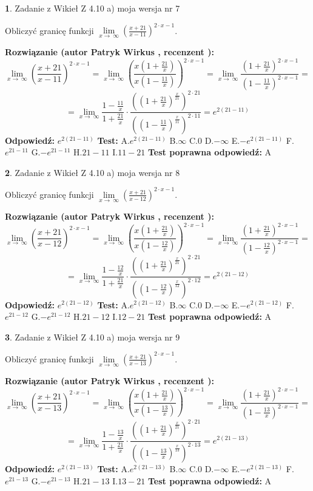 \documentclass[12pt, a4paper]{article}
\theoremstyle{definition} %
\newtheorem{zad}{}
\newcommand{\zadStart}[1]{\begin{zad}#1\newline}
\newcommand{\zadStop}{\end{zad}}
\newcommand{\rozwStart}[2]{\noindent \textbf{Rozwiązanie (autor #1 , recenzent #2): }\newline}
\newcommand{\rozwStop}{\newline}
\newcommand{\odpStart}{\noindent \textbf{Odpowiedź:}\newline}
\newcommand{\odpStop}{\newline}
\newcommand{\testStart}{\noindent \textbf{Test:}\newline}
\newcommand{\testStop}{\newline}
\newcommand{\kluczStart}{\noindent \textbf{Test poprawna odpowiedź:}\newline}
\newcommand{\kluczStop}{\newline}
\begin{document}
\zadStart{Zadanie z Wikieł Z 4.10 a) moja wersja nr 7}


Obliczyć granicę funkcji  $\lim\limits_{x\to\ \infty}(\frac{x+21}{x-11})^{2\cdot x-1}$.
\zadStop
\rozwStart{Patryk Wirkus}{}
$$\lim\limits_{x\to\ \infty}(\frac{x+21}{x-11})^{2\cdot x-1} = \lim\limits_{x\to\ \infty}(\frac{x(1+\frac{21}{x})}{x(1-\frac{11}{x})})^{2\cdot x-1}=\lim\limits_{x\to\ \infty}\frac{(1+\frac{21}{x})^{2\cdot x-1}}{(1-\frac{11}{x})^{2\cdot x-1}}=$$
$$=\lim\limits_{x\to\ \infty}\frac{1-\frac{11}{x}}{1+\frac{21}{x}}\cdot\frac{((1+\frac{21}{x})^{\frac{x}{21}})^{2\cdot21}}{((1-\frac{11}{x})^{\frac{x}{11}})^{2\cdot11}}=e^{2(21-11)}$$
\rozwStop
\odpStart
$e^{2(21-11)}$
\odpStop
\testStart
A.$e^{2(21-11)}$ B.$\infty$ C.$0$ D.$-\infty$ E.$-e^{2(21-11)}$
F.$e^{21-11}$ G.$-e^{21-11}$
H.$21-11$
I.$11-21$
\testStop
\kluczStart
A
\kluczStop



\zadStart{Zadanie z Wikieł Z 4.10 a) moja wersja nr 8}


Obliczyć granicę funkcji  $\lim\limits_{x\to\ \infty}(\frac{x+21}{x-12})^{2\cdot x-1}$.
\zadStop
\rozwStart{Patryk Wirkus}{}
$$\lim\limits_{x\to\ \infty}(\frac{x+21}{x-12})^{2\cdot x-1} = \lim\limits_{x\to\ \infty}(\frac{x(1+\frac{21}{x})}{x(1-\frac{12}{x})})^{2\cdot x-1}=\lim\limits_{x\to\ \infty}\frac{(1+\frac{21}{x})^{2\cdot x-1}}{(1-\frac{12}{x})^{2\cdot x-1}}=$$
$$=\lim\limits_{x\to\ \infty}\frac{1-\frac{12}{x}}{1+\frac{21}{x}}\cdot\frac{((1+\frac{21}{x})^{\frac{x}{21}})^{2\cdot21}}{((1-\frac{12}{x})^{\frac{x}{12}})^{2\cdot12}}=e^{2(21-12)}$$
\rozwStop
\odpStart
$e^{2(21-12)}$
\odpStop
\testStart
A.$e^{2(21-12)}$ B.$\infty$ C.$0$ D.$-\infty$ E.$-e^{2(21-12)}$
F.$e^{21-12}$ G.$-e^{21-12}$
H.$21-12$
I.$12-21$
\testStop
\kluczStart
A
\kluczStop



\zadStart{Zadanie z Wikieł Z 4.10 a) moja wersja nr 9}


Obliczyć granicę funkcji  $\lim\limits_{x\to\ \infty}(\frac{x+21}{x-13})^{2\cdot x-1}$.
\zadStop
\rozwStart{Patryk Wirkus}{}
$$\lim\limits_{x\to\ \infty}(\frac{x+21}{x-13})^{2\cdot x-1} = \lim\limits_{x\to\ \infty}(\frac{x(1+\frac{21}{x})}{x(1-\frac{13}{x})})^{2\cdot x-1}=\lim\limits_{x\to\ \infty}\frac{(1+\frac{21}{x})^{2\cdot x-1}}{(1-\frac{13}{x})^{2\cdot x-1}}=$$
$$=\lim\limits_{x\to\ \infty}\frac{1-\frac{13}{x}}{1+\frac{21}{x}}\cdot\frac{((1+\frac{21}{x})^{\frac{x}{21}})^{2\cdot21}}{((1-\frac{13}{x})^{\frac{x}{13}})^{2\cdot13}}=e^{2(21-13)}$$
\rozwStop
\odpStart
$e^{2(21-13)}$
\odpStop
\testStart
A.$e^{2(21-13)}$ B.$\infty$ C.$0$ D.$-\infty$ E.$-e^{2(21-13)}$
F.$e^{21-13}$ G.$-e^{21-13}$
H.$21-13$
I.$13-21$
\testStop
\kluczStart
A
\kluczStop
\end{document}

